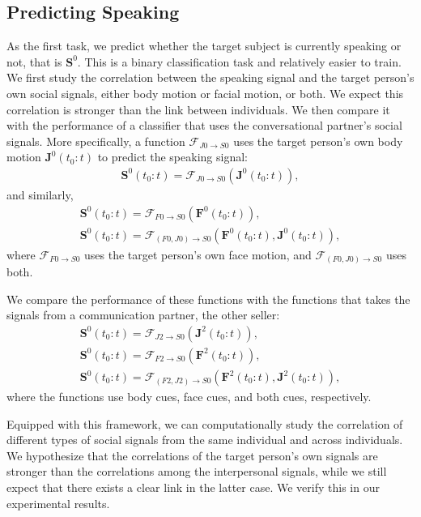 \subsection{Predicting Speaking}
\label{subsection:ssp_pred_speak}
As the first task, we predict whether the target subject is currently speaking or not, that is $\mathbf{S}^0$.  This is a binary classification task and relatively easier to train. We first study the correlation between the speaking signal and the target person's own social signals, either body motion or facial motion, or both. We expect this correlation is stronger than the link between individuals. We then compare it with the performance of a classifier that uses the conversational partner's social signals. More specifically, a function $\mathcal{F}_{J0\rightarrow S0}$ uses the target person's own body motion $\mathbf{J}^0(t_0:t)$ to predict the speaking signal:
\begin{gather}	
\mathbf{S}^0(t_0:t) = \mathcal{F}_{J0\rightarrow S0} \left( \mathbf{J}^0(t_0:t) \right),
\label{eq:speaking_0}
\end{gather}
and similarly,
\begin{gather}	
\mathbf{S}^0(t_0:t) = \mathcal{F}_{F0\rightarrow S0} \left( \mathbf{F}^0(t_0:t) \right),\\
\mathbf{S}^0(t_0:t) = \mathcal{F}_{(F0, J0)\rightarrow S0} \left( \mathbf{F}^0(t_0:t) , \mathbf{J}^0(t_0:t)\right),
\label{eq:speaking_0_facebody}
\end{gather}
where $\mathcal{F}_{F0\rightarrow S0}$ uses the target person's own face motion, and $\mathcal{F}_{(F0, J0)\rightarrow S0}$ uses both. 

We compare the performance of these functions with the functions that takes the signals from a communication partner, the other seller:
\begin{gather}	
\mathbf{S}^0(t_0:t) = \mathcal{F}_{J2\rightarrow S0} \left( \mathbf{J}^2(t_0:t) \right),\\
\mathbf{S}^0(t_0:t) = \mathcal{F}_{F2\rightarrow S0} \left( \mathbf{F}^2(t_0:t) \right),\\
\mathbf{S}^0(t_0:t) = \mathcal{F}_{(F2, J2)\rightarrow S0} \left( \mathbf{F}^2(t_0:t), \mathbf{J}^2(t_0:t) \right),
\label{eq:speaking_1}
\end{gather}
where the functions use body cues, face cues, and both cues, respectively. 

Equipped with this framework, we can computationally study the correlation of different types of social signals from the same individual and across individuals. We hypothesize that the correlations of the target person's own signals are stronger than the correlations among the interpersonal signals, while we still expect that there exists a clear link in the latter case. We verify this in our experimental results.

